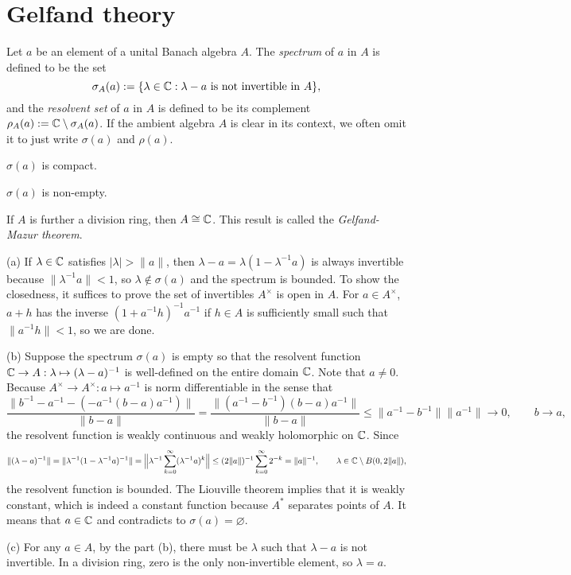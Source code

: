 \documentclass{../../large}
\begin{document}
\section{Gelfand theory}

\begin{prb}
Let $a$ be an element of a unital Banach algebra $A$.
The \emph{spectrum} of $a$ in $A$ is defined to be the set
\[\sigma_A(a):=\{\lambda\in\mathbb{C}:\lambda-a\text{ is not invertible in }A\},\]
and the \emph{resolvent set} of $a$ in $A$ is defined to be its complement $\rho_A(a):=\mathbb{C}\setminus\sigma_A(a)$.
If the ambient algebra $A$ is clear in its context, we often omit it to just write $\sigma(a)$ and $\rho(a)$.
\begin{parts}
\item $\sigma(a)$ is compact.
\item $\sigma(a)$ is non-empty.
\item If $A$ is further a division ring, then $A\cong\mathbb{C}$. This result is called the \emph{Gelfand-Mazur theorem}.
\end{parts}
\end{prb}
\begin{pf}
(a)
If $\lambda\in\mathbb{C}$ satisfies $|\lambda|>\|a\|$, then $\lambda-a=\lambda(1-\lambda^{-1}a)$ is always invertible because $\|\lambda^{-1}a\|<1$, so $\lambda\notin\sigma(a)$ and the spectrum is bounded.
To show the closedness, it suffices to prove the set of invertibles $A^\times$ is open in $A$.
For $a\in A^\times$, $a+h$ has the inverse $(1+a^{-1}h)^{-1}a^{-1}$ if $h\in A$ is sufficiently small such that $\|a^{-1}h\|<1$, so we are done.

(b)
Suppose the spectrum $\sigma(a)$ is empty so that the resolvent function $\mathbb{C}\to A:\lambda\mapsto(\lambda-a)^{-1}$ is well-defined on the entire domain $\mathbb{C}$.
Note that $a\ne0$.
Because $A^\times\to A^\times:a\mapsto a^{-1}$ is norm differentiable in the sense that
\[\frac{\|b^{-1}-a^{-1}-(-a^{-1}(b-a)a^{-1})\|}{\|b-a\|}
=\frac{\|(a^{-1}-b^{-1})(b-a)a^{-1}\|}{\|b-a\|}
\le\|a^{-1}-b^{-1}\|\|a^{-1}\|\to0,\qquad b\to a,\]
the resolvent function is weakly continuous and weakly holomorphic on $\mathbb{C}$.
Since
\[\|(\lambda-a)^{-1}\|=\|\lambda^{-1}(1-\lambda^{-1}a)^{-1}\|
=\Bigl\|\lambda^{-1}\sum_{k=0}^\infty(\lambda^{-1}a)^k\Bigr\|
\le(2\|a\|)^{-1}\sum_{k=0}^\infty2^{-k}=\|a\|^{-1},\qquad\lambda\in\mathbb{C}\setminus B(0,2\|a\|),\]
the resolvent function is bounded.
The Liouville theorem implies that it is weakly constant, which is indeed a constant function because $A^*$ separates points of $A$.
It means that $a\in\mathbb{C}$ and contradicts to $\sigma(a)=\varnothing$.

(c)
For any $a\in A$, by the part (b), there must be $\lambda$ such that $\lambda-a$ is not invertible.
In a division ring, zero is the only non-invertible element, so $\lambda=a$.
\end{pf}
\end{document}
